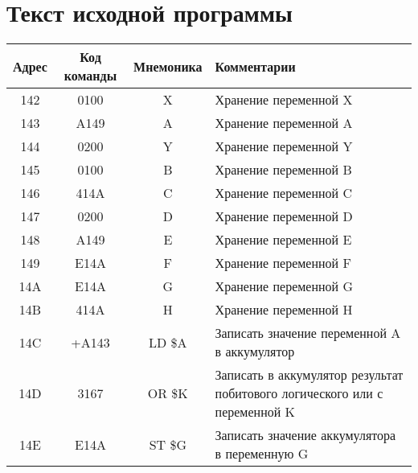 \section{Текст исходной программы}
\begin{table}[h!]
    \centering
    \begin{longtable}{| c | c | c | p{9.5cm} |}
        \hline
        \small
        Адрес & Код команды & Мнемоника & Комментарии                                                                \\
        \hline
        142   & 0100        & X         & Хранение переменной X                                                      \\
        143   & A149        & A         & Хранение переменной A                                                      \\
        144   & 0200        & Y         & Хранение переменной Y                                                      \\
        145   & 0100        & B         & Хранение переменной B                                                      \\
        146   & 414A        & C         & Хранение переменной C                                                      \\
        147   & 0200        & D         & Хранение переменной D                                                      \\
        148   & A149        & E         & Хранение переменной E                                                      \\
        149   & E14A        & F         & Хранение переменной F                                                      \\
        14A   & E14A        & G         & Хранение переменной G                                                      \\
        14B   & 414A        & H         & Хранение переменной H                                                      \\
        \hline
        14C   & +A143       & LD \$A    & Записать значение переменной A в аккумулятор                               \\ %
        14D   & 3167        & OR \$K    & Записать в аккумулятор результат побитового логического или с переменной K \\ %
        14E   & E14A        & ST \$G    & Записать значение аккумулятора в переменную G                              \\ %

\end{longtable}
\end{table}
